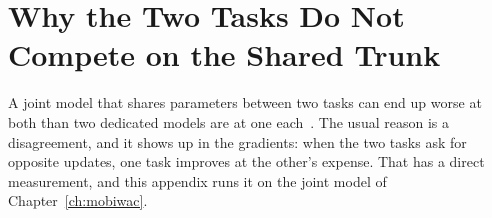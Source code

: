 \chapter{Why the Two Tasks Do Not Compete on the Shared Trunk}
\label{apx:cosine}

A joint model that shares parameters between two tasks can end up worse at both than two dedicated
models are at one each~\cite{standley2020tasks}.
The usual reason is a disagreement, and it shows up in the gradients: when the
two tasks ask for opposite updates, one task improves at the other's expense. That has a direct measurement, and this appendix runs it on the joint model of
Chapter~\ref{ch:mobiwac}.

